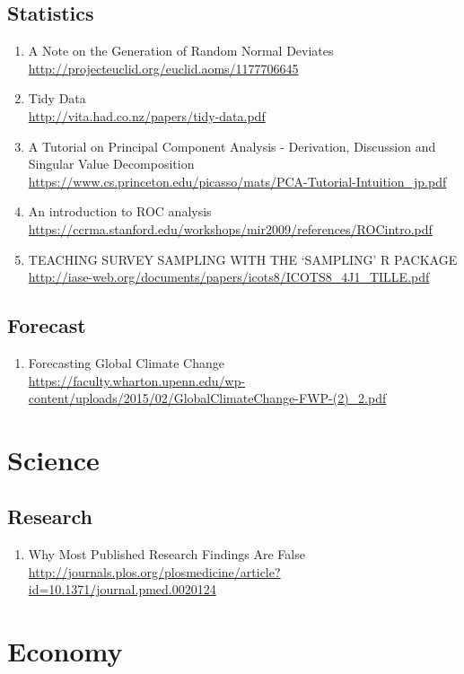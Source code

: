 \documentclass{article}
\begin{document}
\subsection {Statistics}
\begin{enumerate}
	\item {A Note on the Generation of Random Normal Deviates\\
\url{http://projecteuclid.org/euclid.aoms/1177706645}}
	\item {Tidy Data\\
\url{http://vita.had.co.nz/papers/tidy-data.pdf}}
	\item {A Tutorial on Principal Component Analysis - Derivation, Discussion and Singular Value Decomposition\\
\url{https://www.cs.princeton.edu/picasso/mats/PCA-Tutorial-Intuition_jp.pdf}}
	\item{An introduction to ROC analysis\\
\url{https://ccrma.stanford.edu/workshops/mir2009/references/ROCintro.pdf}}
	\item{TEACHING SURVEY SAMPLING WITH THE ‘SAMPLING’ R PACKAGE  \url{http://iase-web.org/documents/papers/icots8/ICOTS8_4J1_TILLE.pdf}}
\end{enumerate}
\subsection{Forecast}
\begin{enumerate}
	\item {Forecasting Global Climate Change\\
\url{https://faculty.wharton.upenn.edu/wp-content/uploads/2015/02/GlobalClimateChange-FWP-(2)_2.pdf}}
\end{enumerate}

\section{Science}
\subsection{Research}
\begin{enumerate}
	\item {Why Most Published Research Findings Are False\\
	\url{http://journals.plos.org/plosmedicine/article?id=10.1371/journal.pmed.0020124}}
\end{enumerate}

\section{Economy}
\end{document}
